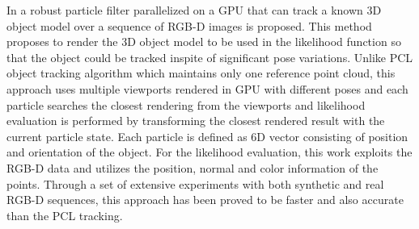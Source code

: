 {In \cite{choi2013rgb} a robust particle filter parallelized on a GPU that can track a known 3D object model over a sequence of RGB-D images is proposed. This method proposes to render the 3D object model to be used in the likelihood function so that the object could be tracked inspite of significant pose variations. Unlike PCL object tracking algorithm \cite{rusu20113d} which maintains only one reference point cloud, this approach uses multiple viewports rendered in GPU with different poses and each particle searches the closest rendering from the viewports and likelihood evaluation is performed by transforming the closest rendered result with the current particle state. Each particle is defined as 6D vector consisting of position and orientation of the object. For the likelihood evaluation, this work exploits the RGB-D data and utilizes the position, normal and color information of the points. Through a set of extensive experiments with both synthetic and real RGB-D sequences, this approach has been proved to be faster and also accurate than the PCL tracking.
	
}

